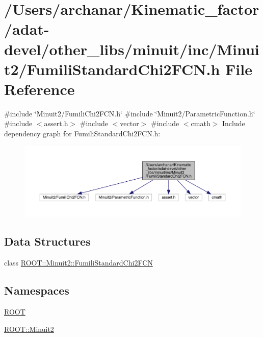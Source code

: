 \hypertarget{adat-devel_2other__libs_2minuit_2inc_2Minuit2_2FumiliStandardChi2FCN_8h}{}\section{/\+Users/archanar/\+Kinematic\+\_\+factor/adat-\/devel/other\+\_\+libs/minuit/inc/\+Minuit2/\+Fumili\+Standard\+Chi2\+F\+CN.h File Reference}
\label{adat-devel_2other__libs_2minuit_2inc_2Minuit2_2FumiliStandardChi2FCN_8h}
{\ttfamily \#include \char`\"{}Minuit2/\+Fumili\+Chi2\+F\+C\+N.\+h\char`\"{}}\newline
{\ttfamily \#include \char`\"{}Minuit2/\+Parametric\+Function.\+h\char`\"{}}\newline
{\ttfamily \#include $<$assert.\+h$>$}\newline
{\ttfamily \#include $<$vector$>$}\newline
{\ttfamily \#include $<$cmath$>$}\newline
Include dependency graph for Fumili\+Standard\+Chi2\+F\+C\+N.\+h\+:
\nopagebreak
\begin{figure}[H]
\begin{center}
\leavevmode
\includegraphics[width=350pt]{d6/dc0/adat-devel_2other__libs_2minuit_2inc_2Minuit2_2FumiliStandardChi2FCN_8h__incl}
\end{center}
\end{figure}
\subsection*{Data Structures}
\begin{DoxyCompactItemize}
\item 
class \mbox{\hyperlink{classROOT_1_1Minuit2_1_1FumiliStandardChi2FCN}{R\+O\+O\+T\+::\+Minuit2\+::\+Fumili\+Standard\+Chi2\+F\+CN}}
\end{DoxyCompactItemize}
\subsection*{Namespaces}
\begin{DoxyCompactItemize}
\item 
 \mbox{\hyperlink{namespaceROOT}{R\+O\+OT}}
\item 
 \mbox{\hyperlink{namespaceROOT_1_1Minuit2}{R\+O\+O\+T\+::\+Minuit2}}
\end{DoxyCompactItemize}
